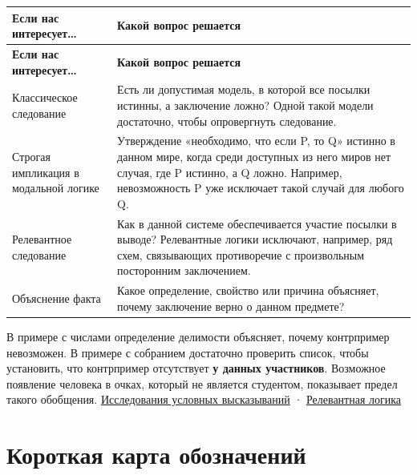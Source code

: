 \documentclass[12pt,a4paper]{article}
\begin{document}
\begin{longtable}{P{.23\linewidth}P{.70\linewidth}}
\toprule
\textbf{Если нас интересует…} & \textbf{Какой вопрос решается} \\
\midrule
\endfirsthead
\toprule
\textbf{Если нас интересует…} & \textbf{Какой вопрос решается} \\
\midrule
\endhead
Классическое следование & Есть ли допустимая модель, в которой все посылки истинны, а заключение ложно? Одной такой модели достаточно, чтобы опровергнуть следование. \\
Строгая импликация в модальной логике & Утверждение «необходимо, что если P, то Q» истинно в данном мире, когда среди доступных из него миров нет случая, где P истинно, а Q ложно. Например, невозможность P уже исключает такой случай для любого Q. \\
Релевантное следование & Как в данной системе обеспечивается участие посылки в выводе? Релевантные логики исключают, например, ряд схем, связывающих противоречие с произвольным посторонним заключением. \\
Объяснение факта & Какое определение, свойство или причина объясняет, почему заключение верно о данном предмете? \\
\bottomrule
\end{longtable}

В примере с числами определение делимости объясняет, почему контрпример невозможен. В примере с собранием достаточно проверить список, чтобы установить, что контрпример отсутствует \textbf{у данных участников}. Возможное появление человека в очках, который не является студентом, показывает предел такого обобщения. \href{https://plato.stanford.edu/entries/logic-conditionals/}{Исследования условных высказываний} · \href{https://plato.stanford.edu/entries/logic-relevance/}{Релевантная логика}

\section{Короткая карта обозначений}
\end{document}
